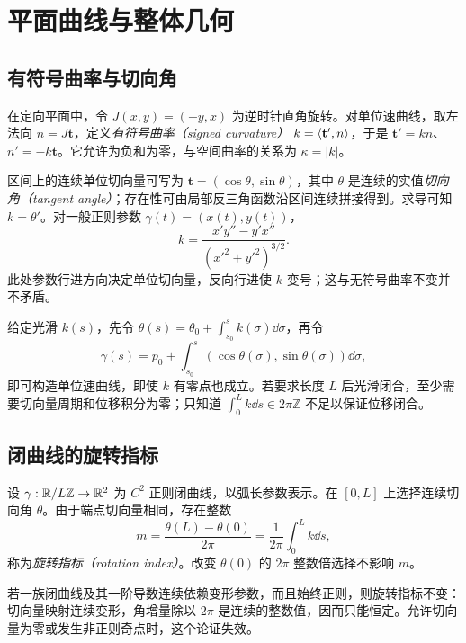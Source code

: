 \setcounter{chapter}{2} %
\chapter{平面曲线与整体几何}
\label{chap:dg-plane}

\section{有符号曲率与切向角}
在定向平面中，令 $J(x,y)=(-y,x)$ 为逆时针直角旋转。对单位速曲线，取左法向 $n=J\mathbf t$，定义\emph{有符号曲率（signed curvature）} $k=\langle \mathbf t',n\rangle$，于是 $\mathbf t'=kn$、$n'=-k\mathbf t$。它允许为负和为零，与空间曲率的关系为 $\kappa=|k|$。

区间上的连续单位切向量可写为 $\mathbf t=(\cos\theta,\sin\theta)$，其中 $\theta$ 是连续的实值\emph{切向角（tangent angle）}；存在性可由局部反三角函数沿区间连续拼接得到。求导可知 $k=\theta'$。对一般正则参数 $\gamma(t)=(x(t),y(t))$，
\begin{equation}
 k=\frac{x'y''-y'x''}{(x'^2+y'^2)^{3/2}}.
 \label{eq:dg-signed-curvature}
\end{equation}
此处参数行进方向决定单位切向量，反向行进使 $k$ 变号；这与无符号曲率不变并不矛盾。

给定光滑 $k(s)$，先令 $\theta(s)=\theta_0+\int_{s_0}^s k(\sigma)\dd\sigma$，再令
\[
 \gamma(s)=p_0+\int_{s_0}^s(\cos\theta(\sigma),\sin\theta(\sigma))\dd\sigma,
\]
即可构造单位速曲线，即使 $k$ 有零点也成立。若要求长度 $L$ 后光滑闭合，至少需要切向量周期和位移积分为零；只知道 $\int_0^L k\dd s\in2\pi\mathbb Z$ 不足以保证位移闭合。

\section{闭曲线的旋转指标}
\begin{definition}[旋转指标]
设 $\gamma:\mathbb R/L\mathbb Z\to\mathbb R^2$ 为 $C^2$ 正则闭曲线，以弧长参数表示。在 $[0,L]$ 上选择连续切向角 $\theta$。由于端点切向量相同，存在整数
\[
 m=\frac{\theta(L)-\theta(0)}{2\pi}
   =\frac1{2\pi}\int_0^L k\dd s,
\]
称为\emph{旋转指标（rotation index）}。改变 $\theta(0)$ 的 $2\pi$ 整数倍选择不影响 $m$。
\end{definition}
若一族闭曲线及其一阶导数连续依赖变形参数，而且始终正则，则旋转指标不变：切向量映射连续变形，角增量除以 $2\pi$ 是连续的整数值，因而只能恒定。允许切向量为零或发生非正则奇点时，这个论证失效。

